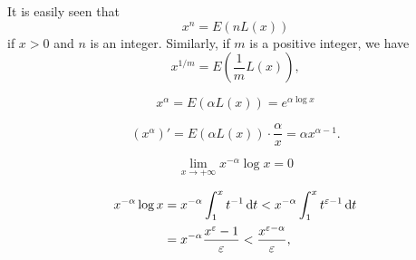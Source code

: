 It is easily seen that
\begin{equation}
    \label{eq:8.41}
    x^n = E(nL(x))
\end{equation}
if $x > 0$ and $n$ is an integer. 
Similarly, if $m$ is a positive integer, we have
\begin{equation}
    \label{eq:8.42}
    x^{1/m} = E(\frac{1}{m}L(x)),
\end{equation}

\begin{equation}
    \label{eq:8.43}
    x^{\alpha} = E(\alpha L(x)) = e^{\alpha \log x}
\end{equation}

\begin{equation}
    \label{eq:8.44}
    (x^{\alpha})' = E(\alpha L(x))\cdot \frac{\alpha}{x} = \alpha x^{\alpha-1}.
\end{equation}


\begin{equation}
    \lim_{x \to +\infty} x^{-\alpha} \log x = 0
\end{equation}


\begin{align*}
    x^{-\alpha} \log x 
    &= x^{-\alpha} \int_{1}^{x} t^{-1} \d t
    <  x^{-\alpha} \int_{1}^{x} t^{\varepsilon-1} \d t \\
    &= x^{-\alpha} \frac{x^{\varepsilon}-1}{\varepsilon}
    <   \frac{x^{\varepsilon-\alpha}}{\varepsilon} ,
\end{align*}